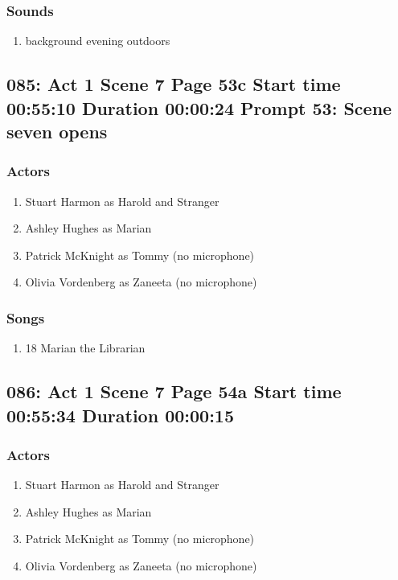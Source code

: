 \subsubsection{Sounds}
\begin{enumerate}
\item background evening outdoors
\end{enumerate}
\subsection{085: Act 1 Scene 7 Page 53c Start time 00:55:10 Duration 00:00:24 Prompt 53: Scene seven opens}

\subsubsection{Actors}
\begin{enumerate}
\item Stuart Harmon as Harold and Stranger
\item Ashley Hughes as Marian
\item Patrick McKnight as Tommy (no microphone)
\item Olivia Vordenberg as Zaneeta (no microphone)
\end{enumerate}

\subsubsection{Songs}
\begin{enumerate}
\item 18 Marian the Librarian
\end{enumerate}
\subsection{086: Act 1 Scene 7 Page 54a Start time 00:55:34 Duration 00:00:15}

\subsubsection{Actors}
\begin{enumerate}
\item Stuart Harmon as Harold and Stranger
\item Ashley Hughes as Marian
\item Patrick McKnight as Tommy (no microphone)
\item Olivia Vordenberg as Zaneeta (no microphone)
\end{enumerate}

